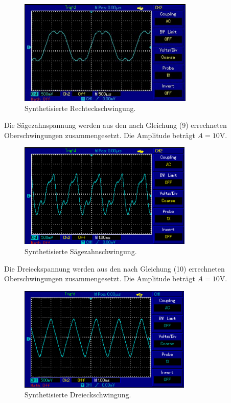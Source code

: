 \begin{figure}[H]
  \centering
  \includegraphics[height=5cm]{rechteck.PNG}
  \caption{Synthetisierte Rechteckschwingung.}
  \label{fig:rechteck}
\end{figure}

Die Sägezahnspannung werden aus den nach Gleichung (9) errechneten Oberschwingungen zusammengesetzt.
Die Amplitude beträgt $A = 10$V.

\begin{figure}[H]
  \centering
  \includegraphics[height=5cm]{saegezahn.PNG}
  \caption{Synthetisierte Sägezahnschwingung.}
  \label{fig:saegezahn}
\end{figure}

\pagebreak

Die Dreieckspannung werden aus den nach Gleichung (10) errechneten Oberschwingungen zusammengesetzt.
Die Amplitude beträgt $A = 10$V.

\begin{figure}[H]
  \centering
  \includegraphics[height=5cm]{dreieck.PNG}
  \caption{Synthetisierte Dreieckschwingung.}
  \label{fig:dreieck}
\end{figure}
